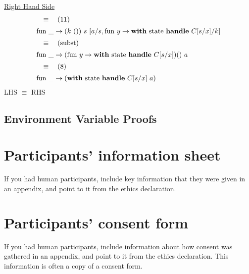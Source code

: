 \documentclass[logo,bsc,singlespacing,parskip]{infthesis}
\begin{document}
\underline{Right Hand Side}
\[ 
\begin{array}{l}
\quad\equiv\quad (11) \\[5pt]
\text{fun }\_ \rightarrow (k\ ())\ s\ [a/s, \text{fun } y \rightarrow \text{\textbf{with} state \textbf{handle} } C[s/x]/k] \\[5pt]
\quad\equiv\quad (\text{subst}) \\[5pt]
\text{fun }\_ \rightarrow (\text{fun } y \rightarrow \text{\textbf{with} state \textbf{handle} } C[s/x]) ()\ a \\[5pt]
\quad\equiv\quad (8) \\[5pt]
\text{fun }\_ \rightarrow (\text{\textbf{with} state \textbf{handle} } C[s/x]\ a)
\end{array}
\]
LHS $\equiv$ RHS

\section{Environment Variable Proofs} \label{environment-variable-proofs}

\chapter{Participants' information sheet}

If you had human participants, include key information that they were given in
an appendix, and point to it from the ethics declaration.

\chapter{Participants' consent form}

If you had human participants, include information about how consent was
gathered in an appendix, and point to it from the ethics declaration.
This information is often a copy of a consent form.
\end{document}
